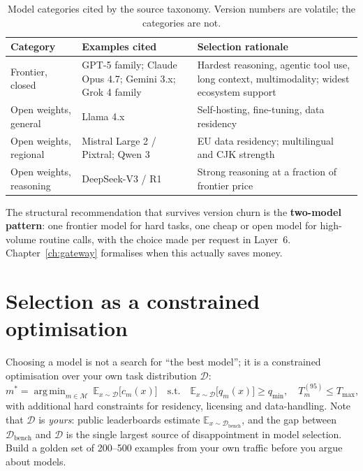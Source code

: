 \documentclass[11pt,twoside,openright]{book}
\theoremstyle{definition}
\theoremstyle{plain}
\theoremstyle{remark}
\newcommand{\term}[1]{\textbf{#1}}
\newcommand{\E}{\mathbb{E}}
\DeclareMathOperator*{\argmin}{arg\,min}
\begin{document}
\begin{table}[H]
\centering\small
\renewcommand{\arraystretch}{1.3}
\begin{tabularx}{\textwidth}{@{}l l X@{}}
\toprule
\textbf{Category} & \textbf{Examples cited} & \textbf{Selection rationale} \\
\midrule
Frontier, closed &
  GPT-5 family; Claude Opus 4.7; Gemini 3.x; Grok 4 family &
  Hardest reasoning, agentic tool use, long context, multimodality;
  widest ecosystem support \\
Open weights, general &
  Llama 4.x &
  Self-hosting, fine-tuning, data residency \\
Open weights, regional &
  Mistral Large 2 / Pixtral; Qwen 3 &
  EU data residency; multilingual and CJK strength \\
Open weights, reasoning &
  DeepSeek-V3 / R1 &
  Strong reasoning at a fraction of frontier price \\
\bottomrule
\end{tabularx}
\caption{Model categories cited by the source taxonomy. Version numbers are
volatile; the categories are not.}
\label{tab:models}
\end{table}

The structural recommendation that survives version churn is the
\term{two-model pattern}: one frontier model for hard tasks, one cheap or
open model for high-volume routine calls, with the choice made per request in
Layer~6. Chapter~\ref{ch:gateway} formalises when this actually saves money.

\section{Selection as a constrained optimisation}

Choosing a model is not a search for ``the best model''; it is a constrained
optimisation over your own task distribution $\mathcal{D}$:
\begin{equation}
  m^{*} = \argmin_{m \in \mathcal{M}} \ \E_{x\sim\mathcal{D}}\bigl[c_m(x)\bigr]
  \quad \text{s.t.} \quad
  \E_{x\sim\mathcal{D}}\bigl[q_m(x)\bigr] \ge q_{\min}, \quad
  T^{(95)}_m \le T_{\max},
\label{eq:model-select}
\end{equation}
with additional hard constraints for residency, licensing and data-handling.
Note that $\mathcal{D}$ is \emph{yours}: public leaderboards estimate
$\E_{x \sim \mathcal{D}_{\text{bench}}}$, and the gap between
$\mathcal{D}_{\text{bench}}$ and $\mathcal{D}$ is the single largest source of
disappointment in model selection. Build a golden set of 200--500 examples from
your own traffic before you argue about models.
\end{document}
